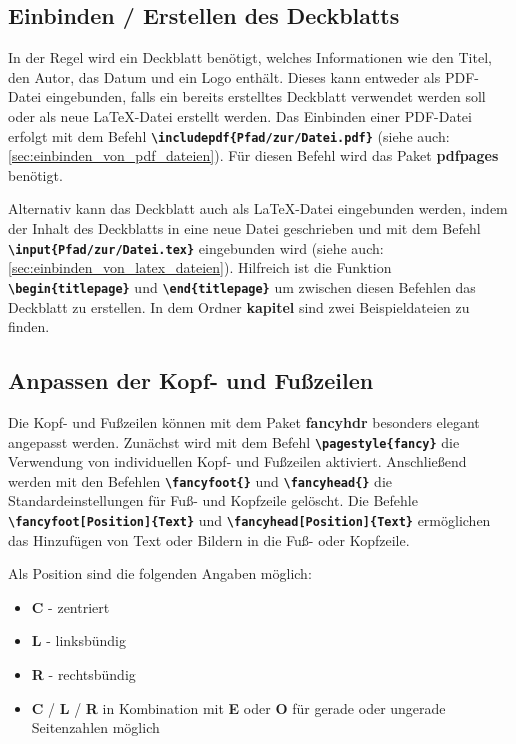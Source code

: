 \subsection{Einbinden / Erstellen des Deckblatts}
In der Regel wird ein Deckblatt benötigt, welches Informationen wie den Titel, den Autor, das Datum und ein Logo enthält. Dieses kann entweder als PDF-Datei eingebunden, falls ein bereits erstelltes Deckblatt verwendet werden soll oder als neue \LaTeX{}-Datei erstellt werden.
Das Einbinden einer PDF-Datei erfolgt mit dem Befehl \textbf{\texttt{\textbackslash includepdf\{Pfad/zur/Datei.pdf\}}} (siehe auch: \ref{sec:einbinden_von_pdf_dateien}). Für diesen Befehl wird das Paket \textbf{pdfpages} benötigt.

Alternativ kann das Deckblatt auch als \LaTeX{}-Datei eingebunden werden, indem der Inhalt des Deckblatts in eine neue Datei geschrieben und mit dem Befehl \textbf{\texttt{\textbackslash input\{Pfad/zur/Datei.tex\}}} eingebunden wird (siehe auch: \ref{sec:einbinden_von_latex_dateien}). Hilfreich ist die Funktion \textbf{\texttt{\textbackslash begin\{titlepage\}}} und \textbf{\texttt{\textbackslash end\{titlepage\}}} um zwischen diesen Befehlen das Deckblatt zu erstellen. In dem Ordner \textbf{kapitel} sind zwei Beispieldateien zu finden.

\subsection{Anpassen der Kopf- und Fußzeilen}
Die Kopf- und Fußzeilen können mit dem Paket \textbf{fancyhdr} besonders elegant angepasst werden. Zunächst wird mit dem Befehl \textbf{\texttt{\textbackslash pagestyle\{fancy\}}} die Verwendung von individuellen Kopf- und Fußzeilen aktiviert. Anschließend werden mit den Befehlen \textbf{\texttt{\textbackslash fancyfoot\{\}}} und \textbf{\texttt{\textbackslash fancyhead\{\}}} die Standardeinstellungen für Fuß- und Kopfzeile gelöscht. Die Befehle \textbf{\texttt{\textbackslash fancyfoot[Position]\{Text\}}} und \textbf{\texttt{\textbackslash fancyhead[Position]\{Text\}}} ermöglichen das Hinzufügen von Text oder Bildern in die Fuß- oder Kopfzeile.

Als Position sind die folgenden Angaben möglich:
\begin{itemize}
  \item \textbf{C} - zentriert
  \item \textbf{L} - linksbündig
  \item \textbf{R} - rechtsbündig
  \item \textbf{C} / \textbf{L} / \textbf{R} in Kombination mit \textbf{E} oder \textbf{O} für gerade oder ungerade Seitenzahlen möglich
\end{itemize}

